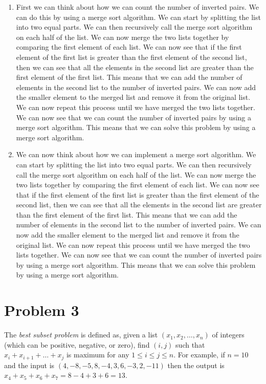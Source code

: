 \documentclass[12pt,letterpaper]{article}
\begin{document}
\begin{enumerate}
    \item First we can think about how we can count the number of inverted pairs. We can do this by
    using a merge sort algorithm. We can start by splitting the list into two equal parts. We can then
    recursively call the merge sort algorithm on each half of the list. We can now merge the two lists
    together by comparing the first element of each list. We can now see that if the first element of the
    first list is greater than the first element of the second list, then we can see that all the elements
    in the second list are greater than the first element of the first list. This means that we can add
    the number of elements in the second list to the number of inverted pairs. We can now add the smaller
    element to the merged list and remove it from the original list. We can now repeat this process until
    we have merged the two lists together. We can now see that we can count the number of inverted pairs
    by using a merge sort algorithm. This means that we can solve this problem by using a merge sort algorithm.
    \item We can now think about how we can implement a merge sort algorithm. We can start by splitting the list
    into two equal parts. We can then recursively call the merge sort algorithm on each half of the list. We can now
    merge the two lists together by comparing the first element of each list. We can now see that if the first element
    of the first list is greater than the first element of the second list, then we can see that all the elements in the
    second list are greater than the first element of the first list. This means that we can add the number of elements
    in the second list to the number of inverted pairs. We can now add the smaller element to the merged list and remove
    it from the original list. We can now repeat this process until we have merged the two lists together. We can now see
    that we can count the number of inverted pairs by using a merge sort algorithm. This means that we can solve this problem
    by using a merge sort algorithm.
\end{enumerate}

\pagebreak

\section*{Problem 3}
The \textit{best subset problem} is defined as, given a list $(x_1, x_2, \ldots , x_n)$ of integers 
(which can be positive, negative, or zero), find $(i, j)$ such that $x_i + x_{i+1} + \ldots + x_j$ is 
maximum for any $1 \leq i \leq j \leq n.$ For example, if $n = 10$ and the input is $(4, -8, -5, 8, -4, 3, 6, -3, 2, -11)$ 
then the output is $x_4 + x_5 + x_6 + x_7 = 8 - 4 + 3 + 6 = 13.$
\end{document}

